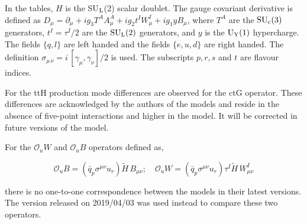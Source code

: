 In the tables, $H$ is the SU$_{\textrm L}$(2) scalar doublet. The gauge covariant derivative is defined as  $D_\mu = \partial_\mu + i g_3 T^A A^A_\mu + i g_2  t^I W^I_\mu + i g_1 y B_\mu$, where $T^A$ are the $\rm SU_c(3)$ generators, $t^I=\tau^I/2$ are the $\rm SU_L(2)$ generators, and $y$ is the $\rm U_Y(1)$ hypercharge. The fields $\{q,l \}$ are left handed and the fields $\{e,u,d\}$ are right handed. The definition $\sigma_{\mu \, \nu} = i \, [\gamma_\mu,\gamma_\nu]/2$ is used. The subscripts $p,r,s$ and $t$ are flavour indices.

For the ttH production mode differences are observed for the ctG operator. These differences are acknowledged by the authors of the models and reside in the absence of five-point interactions and higher in the \SMEFTsim model. It will be corrected in future versions of the model.

For the $\mathcal{O}_uW$ and $\mathcal{O}_uB$ operators defined as,

$$ \mathcal{O}_uB = (\bar q_p \sigma^{\mu\nu} u_r) \widetilde H \, B_{\mu\nu}; \quad
   \mathcal{O}_uW =  (\bar q_p \sigma^{\mu\nu} u_r) \tau^I \widetilde H \, W_{\mu\nu}^I
$$

   there is no one-to-one correspondence between the models in their latest versions. The \SMEFTatNLO version released on 2019/04/03 was used instead to compare these two operators.

\begin{center}
  \begin{table}[h]
    \caption{ Comparison of the SM and interference predicitions for the ttH process between the SMEFTsim and SMEFTatNLO for |cuB| (ctB) and |cuW| (ctW). The operator definition are given in the way they are implemented in \SMEFTsim.}
    \label{tab:higgseft:comptth2}
\end{table}
\end{center}


